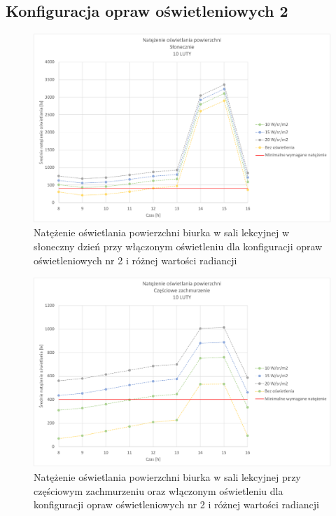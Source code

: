\documentclass[a4paper,12pt]{article}
\begin{document}
	\subsection{Konfiguracja opraw oświetleniowych 2}
	\label{sec:oswietlenie_2}
	
	\begin{figure}[!ht]
		\centering
		\includegraphics[width=\linewidth]{Wykresy/oswietlenie_2_slonecznie.pdf}
		\caption{Natężenie oświetlania powierzchni biurka w sali lekcyjnej w słoneczny dzień przy włączonym oświetleniu dla konfiguracji opraw oświetleniowych nr 2 i różnej wartości radiancji}
		\label{oswietlenie_2_slonecznie}
	\end{figure}
	
	\begin{figure}[!ht]
		\centering
		\includegraphics[width=\linewidth]{Wykresy/oswietlenie_2_czesciowe_zachmurzenie.pdf}
		\caption{Natężenie oświetlania powierzchni biurka w sali lekcyjnej przy częściowym zachmurzeniu  oraz włączonym oświetleniu dla konfiguracji opraw oświetleniowych nr 2 i różnej wartości radiancji}
		\label{oswietlenie_2_czesciowe_zachmurzenie}
	\end{figure}
	
\end{document}
